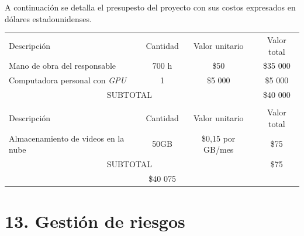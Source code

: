 \documentclass[
11pt, %
]{charter}
\begin{document}
A continuación se detalla el presupesto del proyecto con sus costos expresados en dólares estadounidenses.

\begin{table}[htpb]
\centering
\begin{tabularx}{\linewidth}{@{}|X|c|r|r|@{}}
\hline
\rowcolor[HTML]{C0C0C0} 
\multicolumn{4}{|c|}{\cellcolor[HTML]{C0C0C0}COSTOS DIRECTOS} \\ \hline
\rowcolor[HTML]{C0C0C0} 
Descripción &
  \multicolumn{1}{c|}{\cellcolor[HTML]{C0C0C0}Cantidad} &
  \multicolumn{1}{c|}{\cellcolor[HTML]{C0C0C0}Valor unitario} &
  \multicolumn{1}{c|}{\cellcolor[HTML]{C0C0C0}Valor total} \\ \hline
  
 \multicolumn{1}{|l|}{Mano de obra del responsable} &
  \multicolumn{1}{c|}{700 h} & 
  \multicolumn{1}{c|}{\$50} &
  \multicolumn{1}{c|}{\$35 000} \\ \hline
 
  \multicolumn{1}{|l|}{Computadora personal con \textit{GPU}} &
 \multicolumn{1}{c|}{1} & 
 \multicolumn{1}{c|}{\$5 000} &
 \multicolumn{1}{c|}{\$5 000} \\ \hline

\multicolumn{3}{|c|}{SUBTOTAL} &
  \multicolumn{1}{c|}{\$40 000} \\ \hline
\rowcolor[HTML]{C0C0C0} 
\multicolumn{4}{|c|}{\cellcolor[HTML]{C0C0C0}COSTOS INDIRECTOS} \\ \hline
\rowcolor[HTML]{C0C0C0} 
Descripción &
  \multicolumn{1}{c|}{\cellcolor[HTML]{C0C0C0}Cantidad} &
  \multicolumn{1}{c|}{\cellcolor[HTML]{C0C0C0}Valor unitario} &
  \multicolumn{1}{c|}{\cellcolor[HTML]{C0C0C0}Valor total} \\ \hline
 \multicolumn{1}{|l|}{Almacenamiento de videos en la nube } &
\multicolumn{1}{c|}{50GB} & 
\multicolumn{1}{c|}{\$0,15 por GB/mes} &
\multicolumn{1}{c|}{\$75} \\ \hline
\multicolumn{3}{|c|}{SUBTOTAL} &
  \multicolumn{1}{c|}{\$75} \\ \hline
\rowcolor[HTML]{C0C0C0}
\multicolumn{3}{|c|}{TOTAL} &
  \multicolumn{1}{|c|}{\$40 075} \\ \hline
\end{tabularx}%
\end{table}


\section{13. Gestión de riesgos}
\label{sec:riesgos}
\end{document}
